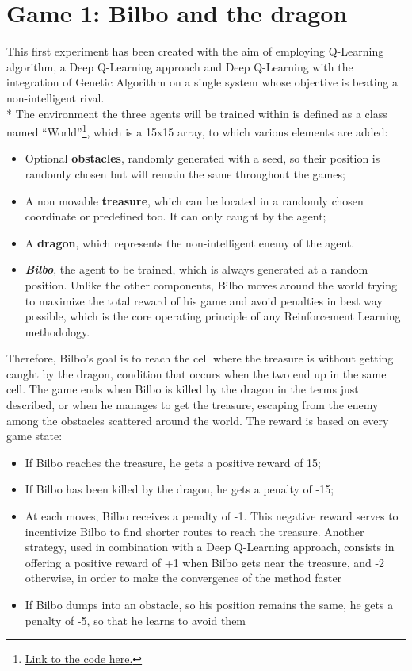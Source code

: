 \section{Game 1: Bilbo and the dragon}
This first experiment has been created with the aim of employing Q-Learning algorithm, a Deep Q-Learning approach and Deep Q-Learning with the integration of Genetic Algorithm on a single system whose objective is beating a non-intelligent rival.\\*
The environment the three agents will be trained within is defined as a class named ``World''\footnote{\href{https://github.com/moiraghif/DragonHunting/blob/master/Bilbo\%20World/CreateBilboWorld.py}{Link to the code here.}}, which is a 15x15 array, to which various elements are added:
\begin{itemize}[noitemsep, topsep=0ex]
  \item Optional \textbf{obstacles}, randomly generated with a seed, so their position is randomly chosen but will remain the same throughout the games;
  \item A non movable \textbf{treasure}, which can be located in a randomly chosen coordinate or predefined too. It can only caught by the agent;
  \item A \textbf{dragon}, which represents the non-intelligent enemy of the agent.
  \item \textit{\textbf{Bilbo}}, the agent to be trained, which is always generated at a random position. Unlike the other components, Bilbo moves around the world trying to maximize the total reward of his game and avoid penalties in best way possible, which is the core operating principle of any Reinforcement Learning methodology.
\end{itemize}
Therefore, Bilbo's goal is to reach the cell where the treasure is without getting caught by the dragon, condition that occurs when the two end up in the same cell. The game ends when Bilbo is killed by the dragon in the terms just described, or when he manages to get the treasure, escaping from the enemy among the obstacles scattered around the world. The reward is based on every game state:
\begin{itemize}[noitemsep, topsep=0ex]
  \item If Bilbo reaches the treasure, he gets a positive reward of 15;
  \item If Bilbo has been killed by the dragon, he gets a penalty of -15;
  \item At each moves, Bilbo receives a penalty of -1. This negative reward serves to incentivize Bilbo to find shorter routes to reach the treasure. Another strategy, used in combination with a Deep Q-Learning approach, consists in offering a positive reward of +1 when Bilbo gets near the treasure, and -2 otherwise, in order to make the convergence of the method faster
  \item If Bilbo dumps into an obstacle, so his position remains the same, he gets a penalty of -5, so that he learns to avoid them
\end{itemize}

